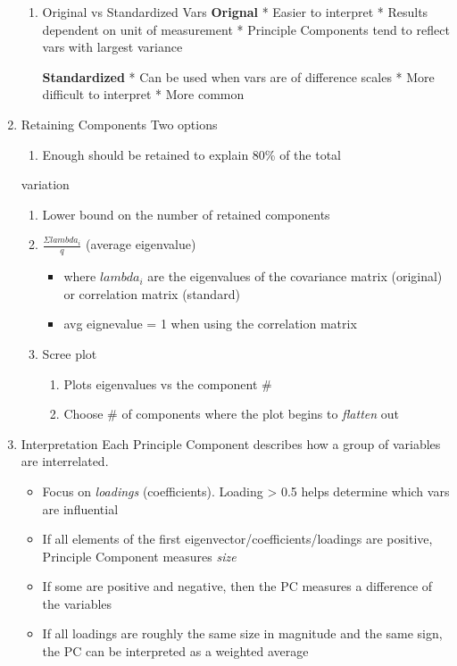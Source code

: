 \documentclass[11pt]{article}
\begin{document}
\begin{enumerate}
\begin{enumerate}
\item Original vs Standardized Vars
\label{sec:orgba99276}
\textbf{Orignal} * Easier to interpret * Results dependent on unit of
measurement * Principle Components tend to reflect vars with largest
variance

\textbf{Standardized} * Can be used when vars are of difference scales * More
difficult to interpret * More common
\end{enumerate}

\item Retaining Components
\label{sec:org7169ae3}
Two options
\begin{enumerate}
\item Enough should be retained to explain 80\% of the total
\end{enumerate}
variation
\begin{enumerate}
\item Lower bound on the number of retained components
\item \(\frac{\Sigma lambda_i} {q}\) (average eigenvalue)
\begin{itemize}
\item where \(lambda_i\) are the eigenvalues of the covariance matrix (original)
or correlation matrix (standard)
\item avg eignevalue = 1 when using the correlation matrix
\end{itemize}
\item Scree plot
\begin{enumerate}
\item Plots eigenvalues vs the component \#
\item Choose \# of components where the plot begins to \emph{flatten} out
\end{enumerate}
\end{enumerate}

\item Interpretation
\label{sec:org2698099}
Each Principle Component describes how a group of variables are
interrelated.

\begin{itemize}
\item Focus on \emph{loadings} (coefficients). Loading > 0.5 helps determine
which vars are influential
\item If all elements of the first eigenvector/coefficients/loadings are
positive, Principle Component measures \emph{size}
\item If some are positive and negative, then the PC measures a difference
of the variables
\item If all loadings are roughly the same size in magnitude and the same
sign, the PC can be interpreted as a weighted average
\end{itemize}
\end{enumerate}
\end{document}
